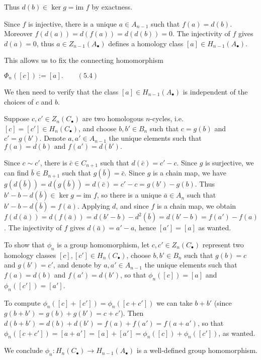 Thus \(d(b) \in \ker g = \text{im } f\) by exactness.

Since \(f\) is injective, there is a unique \(a \in A_{n-1}\) such that \(f(a) = d(b)\). Moreover \(f(d(a)) = d(f(a)) = d(d(b)) = 0\). The injectivity of \(f\) gives \(d(a) = 0\), thus \(a \in Z_{n-1}(A_\bullet)\) defines a homology class \([a] \in H_{n-1}(A_\bullet)\).

This allows us to fix the connecting homomorphism 

\(\Phi_n([c]) := [a]. \qquad (5.4)\)

We then need to verify that the class \([a] \in H_{n-1}(A_\bullet)\) is independent of the choices of \(c\) and \(b\).

Suppose \(c, c' \in Z_n(C_\bullet)\) are two homologous \(n\)-cycles, i.e. \([c] = [c'] \in H_n(C_\bullet)\), and choose \(b, b' \in B_n\) such that \(c = g(b)\) and \(c' = g(b')\). Denote \(a, a' \in A_{n-1}\) the unique elements such that 
\(f(a) = d(b) \text{ and } f(a') = d(b').\)

Since \(c \sim c'\), there is \(\bar{c} \in C_{n+1}\) such that \(d(\bar{c}) = c' - c\). Since \(g\) is surjective, we can find \(\bar{b} \in B_{n+1}\) such that \(g(\bar{b}) = \bar{c}\). 
Since \(g\) is a chain map, we have \(g(d(\bar{b})) = d(g(\bar{b})) = d(\bar{c}) = c' - c = g(b') - g(b)\). 
Thus \(b' - b - d(\bar{b}) \in \ker g = \text{im } f\), so there is a unique \(\bar{a} \in A_n\) such that \(b' - b - d(\bar{b}) = f(\bar{a})\). 
Applying \(d\), and since \(f\) is a chain map, we obtain \(f(d(\bar{a})) = d(f(\bar{a})) = d(b' - b) - d^2(\bar{b}) = d(b' - b) = f(a') - f(a)\). 
The injectivity of \(f\) gives \(d(\bar{a}) = a' - a\), hence \([a'] = [a]\) as wanted. 

To show that \(\phi_n\) is a group homomorphism, let \(c, c' \in Z_n(C_\bullet)\) represent two homology classes \([c], [c'] \in H_n(C_\bullet)\), 
choose \(b, b' \in B_n\) such that \(g(b) = c\) and \(g(b') = c'\), and denote by \(a, a' \in A_{n-1}\) the unique elements such that \(f(a) = d(b)\) and \(f(a') = d(b')\), 
so that \(\phi_n([c]) = [a]\) and \(\phi_n([c']) = [a']\). 

To compute \(\phi_n([c] + [c']) = \phi_n([c + c'])\) we can take \(b + b'\) (since \(g(b + b') = g(b) + g(b') = c + c'\)). Then \(d(b + b') = d(b) + d(b') = f(a) + f(a') = f(a + a')\), so that \(\phi_n([c + c']) = [a + a'] = [a] + [a'] = \phi_n([c]) + \phi_n([c'])\), as wanted.

We conclude \( \phi_n : H_n(C_\bullet) \to H_{n-1}(A_\bullet) \) is a well-defined group homomorphism.
